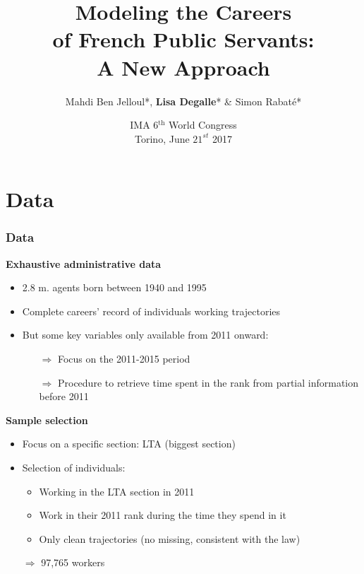 \documentclass[xcolor=table,ignorenonframetext,12pt]{beamer}
\title{Modeling the Careers \\ of French Public Servants: \\ A New Approach}
\author{ Mahdi Ben Jelloul*, \textbf{Lisa Degalle}* \& Simon Rabaté*}
\institute{
  \inst{*} Institut des politiques publiques
}
\date{IMA 6$^{\text{th}}$ World Congress\\
	Torino, June $21^{st}$ 2017}
\begin{document}
\frame{\maketitle}




\section{Data}
\begin{frame}
\frametitle{Data}

\textbf{Exhaustive administrative data}
	\begin{itemize}
	\item 2.8 m. agents born between 1940 and 1995
	\item Complete careers' record of individuals working trajectories
	\item But some key variables only available from 2011 onward:
		\begin{itemize}
		\item[$\Rightarrow$] Focus on the 2011-2015 period
		\item[$\Rightarrow$] Procedure to retrieve time spent in the rank from partial information before 2011
		\end{itemize}
	\end{itemize}
	
\vspace{0.1cm}		
\textbf{Sample selection}		
	\begin{itemize}
	\item Focus on a specific section: LTA (biggest section)
	\item Selection of individuals:
		\begin{itemize}
		\item Working in the LTA section in 2011 
		\item Work in their 2011 rank during the time they spend in it
		\item Only clean trajectories (no missing, consistent with the law) 	
		\end{itemize}
	\item[$\Rightarrow$] 97,765 workers
	\end{itemize}

\end{frame}





\end{document}

